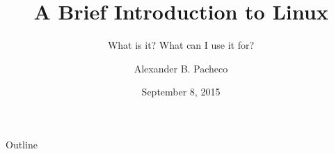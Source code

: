 \documentclass[10pt,t]{beamer}
\title{A Brief Introduction to Linux}
\subtitle{What is it? What can I use it for?}
\author{Alexander B. Pacheco}
\institute{\href{http://researchcomputing.lehigh.edu}{LTS Research Computing}}%
\date{September 8, 2015}
\begin{document}
\begin{frame}[c]
  \titlepage
\end{frame}

\footnotesize
\begin{frame}{Outline}
  \tableofcontents
\end{frame}

\end{document}
